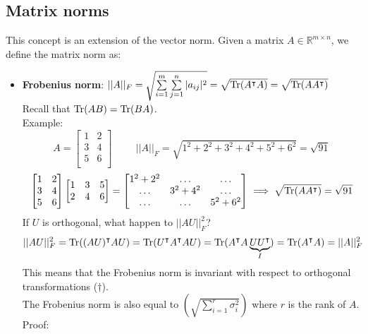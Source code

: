 \subsection{Matrix norms}
This concept is an extension of the vector norm. Given a matrix $A \in \mathbb{R}^{m\times n}$, we define the matrix norm as:
\begin{itemize}
    \item \textbf{Frobenius norm}: $||A||_F = \sqrt{\sum\limits_{i=1}^{m}\sum\limits_{j=1}^{n}|a_{ij}|^2} = \sqrt{\operatorname{Tr}(A^\intercal A)} = \sqrt{\operatorname{Tr}(AA^\intercal)}$ \\
    Recall that $\operatorname{Tr}(AB) = \operatorname{Tr}(BA)$. \\
    Example:
    \[
        A = \begin{bmatrix}
            1 & 2\\
            3 & 4\\
            5 & 6\\
        \end{bmatrix} \hspace{1cm} ||A||_F = \sqrt{1^2 + 2^2 + 3^2 + 4^2 + 5^2 + 6^2} = \sqrt{91}
    \]
    \[
        \begin{bmatrix}
            1 & 2\\
            3 & 4\\
            5 & 6\\
        \end{bmatrix}
        \begin{bmatrix}
            1 & 3 & 5\\
            2 & 4 & 6\\
        \end{bmatrix} =
        \begin{bmatrix}
            1^2+2^2 & \hdots & \hdots\\
            \hdots & 3^2+4^2 & \hdots\\
            \hdots & \hdots & 5^2+6^2\\
        \end{bmatrix}  \implies \sqrt{\operatorname{Tr}(AA^\intercal)} = \sqrt{91}    
    \]
    If $U$ is orthogonal, what happen to $||AU||^2_F$?
    \[
        ||AU||^2_F = \operatorname{Tr}((AU)^\intercal AU) = \operatorname{Tr}(U^\intercal A^\intercal AU) = \operatorname{Tr}(A^\intercal A\underbrace{UU^\intercal}_{I}) = \operatorname{Tr}(A^\intercal A) = ||A||^2_F    
    \]
    This means that the Frobenius norm is invariant with respect to orthogonal transformations ($\dag$). \\ 
    The Frobenius norm is also equal to $\left(\sqrt{\sum\limits_{i=1}^{r}\sigma_i^2}\right)$ where $r$ is the rank of $A$. Proof:

\end{itemize}
